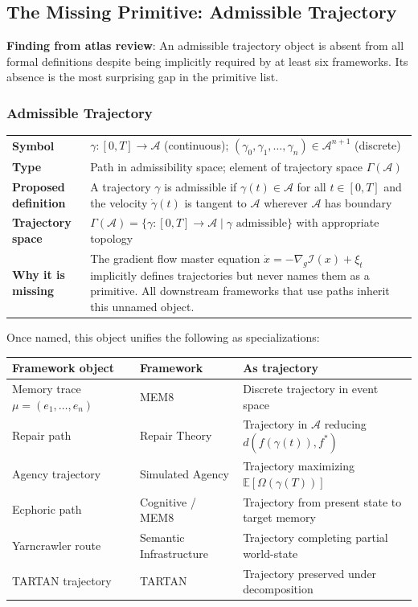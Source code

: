 \documentclass[11pt, a4paper]{article}
\begin{document}
\subsection{The Missing Primitive: Admissible Trajectory}

\begin{notebox}
\textbf{Finding from atlas review}: An admissible trajectory object is
absent from all formal definitions despite being implicitly required
by at least six frameworks. Its absence is the most surprising gap in
the primitive list.
\end{notebox}

\subsubsection{Admissible Trajectory}

\begin{longtable}{lp{10cm}}
\textbf{Symbol} & $\gamma: [0,T] \to \mathcal{A}$ (continuous);
  $(\gamma_0, \gamma_1, \ldots, \gamma_n) \in \mathcal{A}^{n+1}$
  (discrete) \\
\textbf{Type} & Path in admissibility space; element of trajectory
  space $\Gamma(\mathcal{A})$ \\
\textbf{Proposed definition} & A trajectory $\gamma$ is admissible if
  $\gamma(t) \in \mathcal{A}$ for all $t \in [0,T]$ and the velocity
  $\dot{\gamma}(t)$ is tangent to $\mathcal{A}$ wherever $\mathcal{A}$
  has boundary \\
\textbf{Trajectory space} & $\Gamma(\mathcal{A}) = \{\gamma: [0,T]
  \to \mathcal{A} \mid \gamma \text{ admissible}\}$ with appropriate
  topology \\
\textbf{Why it is missing} & The gradient flow master equation
  $\dot{x} = -\nabla_g \mathcal{I}(x) + \xi_t$ implicitly defines
  trajectories but never names them as a primitive. All downstream
  frameworks that use paths inherit this unnamed object. \\
\end{longtable}

\medskip
Once named, this object unifies the following as specializations:

\medskip
\begin{longtable}{lll}
\textbf{Framework object} & \textbf{Framework} & \textbf{As trajectory} \\
\hline
Memory trace $\mu = (e_1,\ldots,e_n)$ & MEM\textbar{}8 &
  Discrete trajectory in event space \\
Repair path & Repair Theory &
  Trajectory in $\mathcal{A}$ reducing $d(f(\gamma(t)), f^*)$ \\
Agency trajectory & Simulated Agency &
  Trajectory maximizing $\mathbb{E}[\Omega(\gamma(T))]$ \\
Ecphoric path & Cognitive / MEM\textbar{}8 &
  Trajectory from present state to target memory \\
Yarncrawler route & Semantic Infrastructure &
  Trajectory completing partial world-state \\
TARTAN trajectory & TARTAN &
  Trajectory preserved under decomposition \\
\end{longtable}
\end{document}
